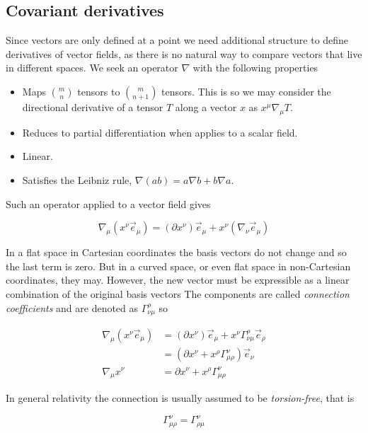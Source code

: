 \subsection{Covariant derivatives}

Since vectors are only defined at a point we need additional structure
to define derivatives of vector fields, as there is no natural way to
compare vectors that live in different spaces.  We seek an operator
$\nabla$ with the following properties

\begin{itemize}
\item Maps ${m \choose n}$ tensors to ${m \choose {n+1}}$ tensors.
This is so we may consider the directional derivative of a tensor $T$
along a vector $x$ as $x^\mu \nabla_\mu T$.
\item Reduces to partial differentiation when applies to a scalar
field.
\item Linear.
\item Satisfies the Leibniz rule, $\nabla(a b) = a\nabla b + b \nabla a$.
\end{itemize}

Such an operator applied to a vector field gives

\begin{equation*}
\nabla_\mu (x^\nu \vec{e}_\mu)
= (\partial x^\nu) \vec{e}_\mu + x^\nu (\nabla_\nu \vec{e}_\mu)
\end{equation*}

In a flat space in Cartesian coordinates the basis vectors do not
change and so the last term is zero.  But in a curved space, or even
flat space in non-Cartesian coordinates, they may.  However, the new
vector must be expressible as a linear combination of the original
basis vectors  The components are called \emph{connection
coefficients} and are denoted as $\Gamma^\rho_{\nu\mu}$ so

\begin{align}
\label{eq:covariant_derivative}
\nabla_\mu (x^\nu \vec{e}_\mu) &= 
(\partial x^\nu) \vec{e}_\mu + 
x^\nu \Gamma^\rho_{\nu\mu} \vec{e}_\rho \\
&= (\partial x^\nu + x^\rho \Gamma^\nu_{\mu\rho}) \vec{e}_\nu \\
\nabla_\mu x^\nu &= \partial x^\nu + x^\rho \Gamma^\nu_{\mu\rho}
\end{align}

In general relativity the connection is usually assumed to be
\emph{torsion-free}, that is

\begin{equation}
\label{eq:torsion}
 \Gamma^\nu_{\mu\rho} =  \Gamma^\nu_{\rho\mu}
\end{equation}

